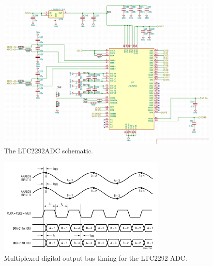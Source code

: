 \begin{figure}[h]
        \centering
        \includegraphics[width=\textwidth]{data/ltc2292-schematic.png}
        \caption{The LTC2292ADC schematic.}
        \label{fig:ltc2292-schematic}
\end{figure}

\begin{figure}[h]
        \centering\includegraphics[width=0.75\textwidth]{data/LTC2292-multiplex.png}
        \caption{Multiplexed digital output bus timing for the LTC2292 ADC.}
        \label{fig:ltc2292-multiplex}
\end{figure}

